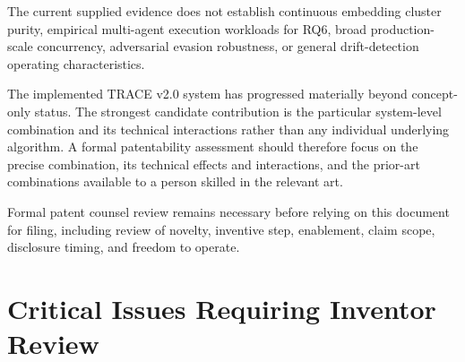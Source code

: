 \documentclass[11pt,a4paper]{article}
\begin{document}
\begin{description}[leftmargin=1.6em, style=nextline]
\item[G. Remaining evidence gap.]
The current supplied evidence does not establish continuous embedding cluster purity,
empirical multi-agent execution workloads for RQ6, broad production-scale concurrency,
adversarial evasion robustness, or general drift-detection operating characteristics.

\item[H. Overall assessment.]
The implemented TRACE v2.0 system has progressed materially beyond concept-only status.
The strongest candidate contribution is the particular system-level combination and its
technical interactions rather than any individual underlying algorithm. A formal
patentability assessment should therefore focus on the precise combination, its
technical effects and interactions, and the prior-art combinations available to a person
skilled in the relevant art.

\item[I. Counsel review.]
Formal patent counsel review remains necessary before relying on this document for filing,
including review of novelty, inventive step, enablement, claim scope, disclosure timing,
and freedom to operate.

\end{description}

\section*{Critical Issues Requiring Inventor Review}
\end{document}
